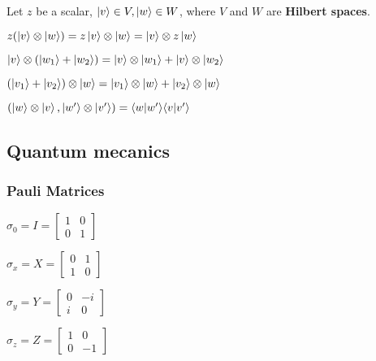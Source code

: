 \documentclass[5pt]{article}
\begin{document}
\begin{multicols}{3}
\begin{properties}
     Let $z$ be a scalar, $\ket{v}\in V, \ket{w}\in W$, where $V$ and $W$ are \textbf{Hilbert spaces}.\\
     \begin{itemize*}
          \item $z(\ket{v}\otimes\ket{w})=z\ket{v}\otimes\ket{w}=\ket{v}\otimes z\ket{w}$\\
          \item $\ket{v}\otimes(\ket{w_1}+\ket{w_2})=\ket{v}\otimes\ket{w_1}+\ket{v}\otimes\ket{w_2}$\\
          \item $(\ket{v_1}+\ket{v_2})\otimes\ket{w}=\ket{v_1}\otimes\ket{w}+\ket{v_2}\otimes\ket{w}$\\
          \item $(\ket{w}\otimes\ket{v},\ket{w'}\otimes\ket{v'})=\langle w|w'\rangle\langle v|v'\rangle$
     \end{itemize*}
\end{properties}

\subsection{Quantum mecanics}
\subsubsection{Pauli Matrices}
\begin{itemize*}
     \item $\sigma_0 = I = \begin{bmatrix}1 & 0 \\ 0 & 1\end{bmatrix}$
     \item $\sigma_x = X = \begin{bmatrix}0 & 1 \\ 1 & 0\end{bmatrix}$
     \item $\sigma_y = Y = \begin{bmatrix}0 & -i \\ i & 0\end{bmatrix}$
     \item $\sigma_z = Z = \begin{bmatrix}1 & 0 \\ 0 & -1\end{bmatrix}$
\end{itemize*}










\end{multicols}
\end{document}
